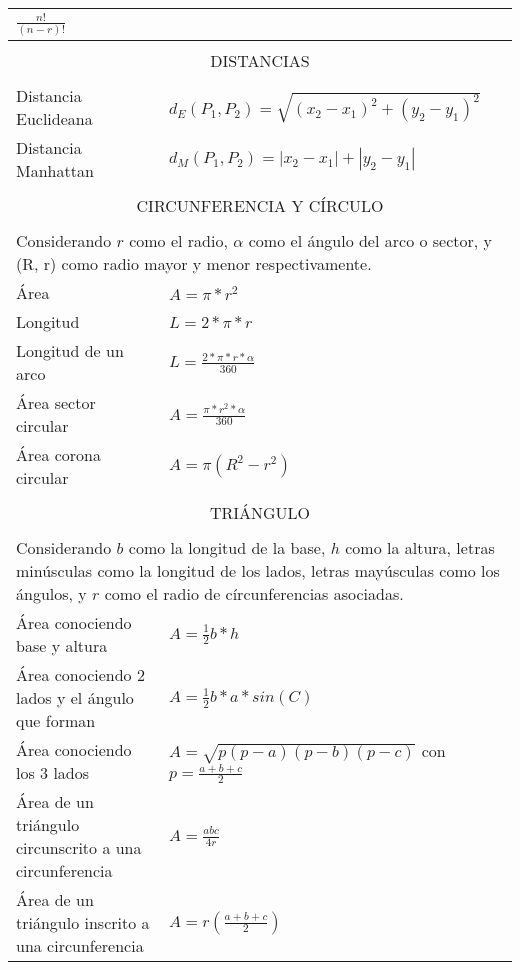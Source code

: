 \begin{center}
\begin{longtable}{|p{3cm}|p{9cm}|}
$\frac{n!}{(n-r)!}$
\\ \hline
\multicolumn{2}{|c|}{} \\
\multicolumn{2}{|c|}{DISTANCIAS} \\
\multicolumn{2}{|c|}{} \\ \hline
Distancia Euclideana & $d_{E}(P_{1},P_{2}) = \sqrt{(x_{2}-x_{1})^{2}+(y_{2}-y_{1})^{2}}$ \\ \hline
Distancia Manhattan & $d_{M}(P_{1}, P_{2}) = |x_{2} - x_{1}| + |y_{2} - y_{1}|$ \\ \hline
\multicolumn{2}{|c|}{} \\
\multicolumn{2}{|c|}{CIRCUNFERENCIA Y CÍRCULO} \\ 
\multicolumn{2}{|c|}{} \\ \hline
\multicolumn{2}{|p{12cm}|}{Considerando $r$ como el radio, $\alpha$ como el ángulo del arco o sector, y (R, r) como radio mayor y menor respectivamente.} \\ \hline
Área                   & $A = \pi * r^{2} $\\ \hline
Longitud               & $L = 2*\pi*r$  \\ \hline
Longitud de un arco    & $L = \frac{2*\pi*r*\alpha}{360}$  \\ \hline
Área sector circular   & $A = \frac{\pi * r^{2} * \alpha}{360}$ \\ \hline
Área corona circular   & $A = \pi  (R^{2} - r^{2})$ \\ \hline
\multicolumn{2}{|c|}{} \\
\multicolumn{2}{|c|}{TRIÁNGULO} \\ 
\multicolumn{2}{|c|}{} \\ \hline
\multicolumn{2}{|p{12cm}|}{Considerando $b$ como la longitud de la base, $h$ como la altura, letras minúsculas como la longitud de los lados, letras mayúsculas como los ángulos, y $r$ como el radio de círcunferencias asociadas.} \\ \hline
Área conociendo base y altura & $A = \frac{1}{2}b * h$ \\ \hline
Área conociendo 2 lados y el ángulo que forman & $A = \frac{1}{2}b*a*sin(C)$ \\ \hline
Área conociendo los 3 lados & $ A = \sqrt{p(p - a)(p - b)(p - c)}$ con $p = \frac{a + b + c}{2}$ \\ \hline
Área de un triángulo circunscrito a una circunferencia & $A = \frac{abc}{4r}$ \\ \hline
Área de un triángulo inscrito a una circunferencia & $A = r(\frac{a+b+c}{2})$ \\ \hline

\end{longtable}
\end{center}
